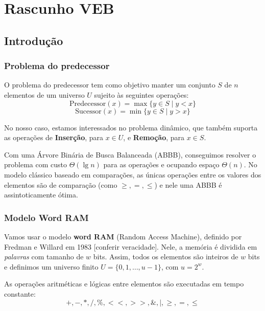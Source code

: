 \chapter{Rascunho VEB}
\label{cap:rascunho-veb}

\section{Introdução}

\subsection{Problema do predecessor}

O problema do predecessor tem como objetivo manter um conjunto $S$ de $n$
elementos de um universo $U$ sujeito às seguintes operações:
\[
\text{Predecessor}(x) = \max \{y \in S \mid y < x \} 
\]
\[
\text{Sucessor}(x) = \min \{y \in S \mid y > x \}
\]

No nosso caso, estamos interessados no problema dinâmico, que também suporta as
operações de \textbf{Inserção}, para $x \in U$, e \textbf{Remoção}, para $x \in
S$.

Com uma Árvore Binária de Busca Balanceada (ABBB), conseguimos resolver o
problema com custo $\Theta (\lg n)$ para as operações e ocupando espaço $\Theta
(n)$.
No modelo clássico baseado em comparações, as únicas operações entre os valores
dos elementos são de comparação (como $\geq, =, \leq$) e nele uma ABBB é
assintoticamente ótima.

\subsection{Modelo Word RAM}

Vamos usar o modelo \textbf{word RAM} (Random Access Machine), definido por
Fredman e Willard em 1983 [conferir veracidade]. Nele, a memória é dividida em
\textit{palavras} com tamanho de $w$ bits. Assim, todos os elementos são
inteiros de $w$ bits e definimos um universo finito $U=\{0,1,\dots,u-1\}$, com
$u=2^w$.  

As operações aritméticas e lógicas entre elementos são executadas em tempo
constante:
\[+, -, *, /,\%,<<,>>,\&,|,\geq,=,\leq\]

